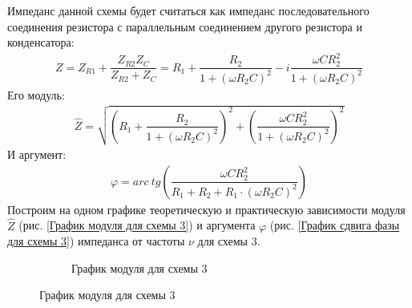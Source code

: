 \documentclass[a4paper, usenames, dvipsnames]{article}
\begin{document}
\begin{enumerate}
          Импеданс данной схемы будет считаться как импеданс
          последовательного соединения резистора
          с параллельным соединением другого резистора и конденсатора:
          \begin{gather*}
              Z = Z_{R1} + \dfrac{Z_{R2} Z_C}{Z_{R2} + Z_C} = R_1 + \dfrac{R_2}{1 + (\omega R_2 C)^2} - i\dfrac{\omega C R_2^2}{1 + (\omega R_2 C)^2}
          \end{gather*}
          Его модуль:
          \begin{gather*}
              \hat{Z} = \sqrt{\left(R_1 + \dfrac{R_2}{1 + (\omega R_2 C)^2}\right)^2 + \left(\dfrac{\omega C R_2^2}{1 + (\omega R_2 C)^2}\right)^2}
          \end{gather*}
          И аргумент:
          \begin{gather*}
              \varphi = arc\ tg\left(\dfrac{\omega C R^2_2}{R_1 + R_2 + R_1 \cdot (\omega R_2 C)^2}\right)
          \end{gather*}
          Построим на одном графике теоретическую и практическую зависимости
          модуля $\hat{Z}$ (рис. \ref{График модуля для схемы 3})
          и аргумента $\varphi$ (рис. \ref{График сдвига фазы для схемы 3})
          импеданса от частоты $\nu$ для схемы 3.
          \begin{figure}[h]
              \begin{subfigure}{0.49\textwidth}
                  \centering\noindent
                  \caption{График модуля для схемы 3}

\end{subfigure}
\end{figure}
\end{enumerate}
\end{document}
